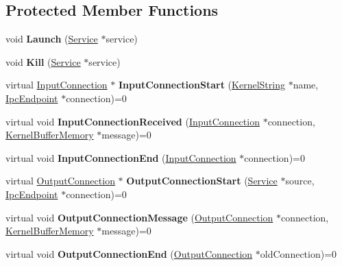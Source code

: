 \subsection*{Protected Member Functions}
\begin{DoxyCompactItemize}
\item 
\mbox{\label{class_generic_provider_afe4705c6685a0037b798ce06ca7d0831}} 
void {\bfseries Launch} (\hyperlink{class_generic_provider_1_1_service}{Service} $\ast$service)
\item 
\mbox{\label{class_generic_provider_abe6cac041cab50af23fffc2fe55c0e8c}} 
void {\bfseries Kill} (\hyperlink{class_generic_provider_1_1_service}{Service} $\ast$service)
\item 
\mbox{\label{class_generic_provider_a529c51b8ab4f6091009f807048d64fd6}} 
virtual \hyperlink{class_generic_provider_1_1_input_connection}{Input\+Connection} $\ast$ {\bfseries Input\+Connection\+Start} (\hyperlink{class_kernel_string}{Kernel\+String} $\ast$name, \hyperlink{class_ipc_endpoint}{Ipc\+Endpoint} $\ast$connection)=0
\item 
\mbox{\label{class_generic_provider_a512426f35c9f30ea0349ee7b8bd8a1c7}} 
virtual void {\bfseries Input\+Connection\+Received} (\hyperlink{class_generic_provider_1_1_input_connection}{Input\+Connection} $\ast$connection, \hyperlink{class_kernel_buffer_memory}{Kernel\+Buffer\+Memory} $\ast$message)=0
\item 
\mbox{\label{class_generic_provider_a9a20dd06d2274a7a14571de2c8f7c29b}} 
virtual void {\bfseries Input\+Connection\+End} (\hyperlink{class_generic_provider_1_1_input_connection}{Input\+Connection} $\ast$connection)=0
\item 
\mbox{\label{class_generic_provider_ad5d5468ae38b686ad72833ac8b67bbfe}} 
virtual \hyperlink{class_generic_provider_1_1_output_connection}{Output\+Connection} $\ast$ {\bfseries Output\+Connection\+Start} (\hyperlink{class_generic_provider_1_1_service}{Service} $\ast$source, \hyperlink{class_ipc_endpoint}{Ipc\+Endpoint} $\ast$connection)=0
\item 
\mbox{\label{class_generic_provider_a8c4b6eecd893d088376e3e83b9ed681a}} 
virtual void {\bfseries Output\+Connection\+Message} (\hyperlink{class_generic_provider_1_1_output_connection}{Output\+Connection} $\ast$connection, \hyperlink{class_kernel_buffer_memory}{Kernel\+Buffer\+Memory} $\ast$message)=0
\item 
\mbox{\label{class_generic_provider_a4a50940010e058da5113119d8eee2d2e}} 
virtual void {\bfseries Output\+Connection\+End} (\hyperlink{class_generic_provider_1_1_output_connection}{Output\+Connection} $\ast$old\+Connection)=0
\end{DoxyCompactItemize}
